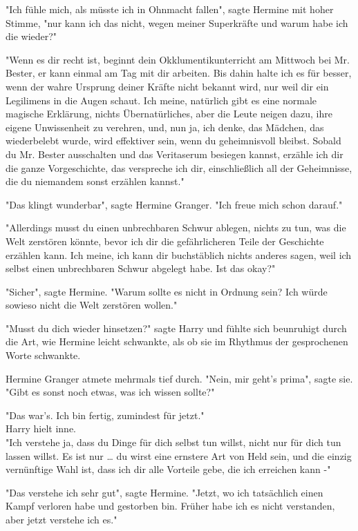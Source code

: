 {"Ich fühle mich, als müsste ich in Ohnmacht fallen", sagte Hermine mit hoher Stimme, "nur kann ich das nicht, wegen meiner Superkräfte und warum habe ich die wieder?"

"Wenn es dir recht ist, beginnt dein Okklumentikunterricht am Mittwoch bei Mr.\\ Bester, er kann einmal am Tag mit dir arbeiten. Bis dahin halte ich es für besser, wenn der wahre Ursprung deiner Kräfte nicht bekannt wird, nur weil dir ein Legilimens in die Augen schaut. Ich meine, natürlich gibt es eine normale magische Erklärung, nichts Übernatürliches, aber die Leute neigen dazu, ihre eigene Unwissenheit zu verehren, und, nun ja, ich denke, das Mädchen, das wiederbelebt wurde, wird effektiver sein, wenn du geheimnisvoll bleibst. Sobald du Mr. Bester ausschalten und das Veritaserum besiegen kannst, erzähle ich dir die ganze Vorgeschichte, das verspreche ich dir, einschließlich all der Geheimnisse, die du niemandem sonst erzählen kannst."

"Das klingt wunderbar", sagte Hermine Granger. "Ich freue mich schon darauf."

"Allerdings musst du einen unbrechbaren Schwur ablegen, nichts zu tun, was die Welt zerstören könnte, bevor ich dir die gefährlicheren Teile der Geschichte erzählen kann. Ich meine, ich kann dir buchstäblich nichts anderes sagen, weil ich selbst einen unbrechbaren Schwur abgelegt habe. Ist das okay?"

"Sicher", sagte Hermine. "Warum sollte es nicht in Ordnung sein? Ich würde sowieso nicht die Welt zerstören wollen."

"Musst du dich wieder hinsetzen?" sagte Harry und fühlte sich beunruhigt durch die Art, wie Hermine leicht schwankte, als ob sie im Rhythmus der gesprochenen Worte schwankte.

Hermine Granger atmete mehrmals tief durch. "Nein, mir geht's prima", sagte sie.\\ "Gibt es sonst noch etwas, was ich wissen sollte?"

"Das war's. Ich bin fertig, zumindest für jetzt."\\ Harry hielt inne.\\ "Ich verstehe ja, dass du Dinge für dich selbst tun willst, nicht nur für dich tun lassen willst. Es ist nur … du wirst eine ernstere Art von Held sein, und die einzig vernünftige Wahl ist, dass ich dir alle Vorteile gebe, die ich erreichen kann -"

"Das verstehe ich sehr gut", sagte Hermine. "Jetzt, wo ich tatsächlich einen Kampf verloren habe und gestorben bin. Früher habe ich es nicht verstanden, aber jetzt verstehe ich es."

}
